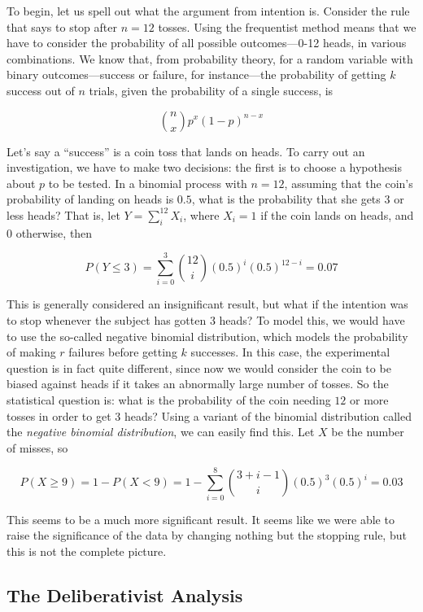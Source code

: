 To begin, let us spell out what the argument from intention is. Consider the rule that says to stop after \(n=12\) tosses. Using the frequentist method means that we have to consider the probability of all
possible outcomes---0-12 heads, in various combinations.  We know that, from probability theory, for a random
variable with binary outcomes---success or failure, for instance---the
probability of getting \(k\) success out of \(n\) trials, given the
probability of a single success, is

\[{n \choose x} p^x (1-p)^{n-x}\]

Let's say a ``success'' is a coin toss that lands on heads. To carry out
an investigation, we have to make two decisions: the first is to choose
a hypothesis about \(p\) to be tested. In a binomial process with
\(n=12\), assuming that the coin's probability of landing on heads is
\(0.5\), what is the probability that she gets 3 or less heads? That is,
let \(Y=\sum_i^{12} X_i\), where \(X_i = 1\) if the coin lands on heads,
and 0 otherwise, then

\[P(Y \leq 3 ) =  \sum_{i=0}^{3} {12 \choose i} (0.5)^i (0.5)^{12-i} = 0.07\]

This is generally considered an insignificant result, but what if the
intention was to stop whenever the subject has gotten 3 heads? To model
this, we would have to use the so-called negative binomial distribution,
which models the probability of making \(r\) failures before getting \(k\)
successes. In this case, the experimental question is in fact quite
different, since now we would consider the coin to be biased against
heads if it takes an abnormally large number of tosses. So the
statistical question is: what is the probability of the coin needing
\(12\) or more tosses in order to get 3 heads? Using a variant of the binomial distribution called the \emph{negative binomial distribution}, we can
easily find this. Let \(X\) be the number of misses, so

\[P(X \geq 9) = 1 - P(X <9) = 1 - \sum_{i=0}^{8} {3+i-1 \choose i} (0.5)^3 (0.5)^{i} =0.03\]

This seems to be a much more significant result. It seems like we were able to raise the significance of the data by changing nothing but the stopping rule, but this is not the complete picture. 

\subsection{The Deliberativist Analysis}

